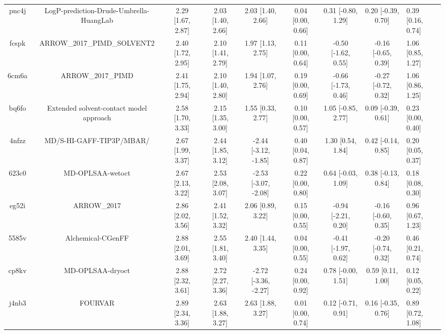 \documentclass{article}
\begin{document}
\begin{center}
\begin{longtable}{|cccccccc|}
 pnc4j &            LogP-prediction-Drude-Umbrella-HuangLab &  2.29 [1.67, 2.87] &  2.03 [1.40, 2.66] &     2.03 [1.40, 2.66] &  0.04 [0.00, 0.66] &   0.31 [-0.80, 1.29] &   0.20 [-0.39, 0.70] &     0.39 [0.16, 0.74] \\
 fcspk &                        ARROW\_2017\_PIMD\_SOLVENT2 &  2.40 [1.72, 2.95] &  2.10 [1.41, 2.79] &     1.97 [1.13, 2.75] &  0.11 [0.00, 0.64] &  -0.50 [-1.62, 0.55] &  -0.16 [-0.65, 0.39] &     1.06 [0.85, 1.27] \\
 6cm6a &                                  ARROW\_2017\_PIMD &  2.41 [1.75, 2.94] &  2.10 [1.40, 2.80] &     1.94 [1.07, 2.76] &  0.19 [0.00, 0.69] &  -0.66 [-1.73, 0.46] &  -0.27 [-0.72, 0.32] &     1.06 [0.86, 1.25] \\
 bq6fo &            Extended solvent-contact model approach &  2.58 [1.70, 3.33] &  2.15 [1.35, 3.00] &     1.55 [0.33, 2.77] &  0.10 [0.00, 0.57] &   1.05 [-0.85, 2.77] &   0.09 [-0.39, 0.61] &     0.23 [0.00, 0.40] \\
 4nfzz &                           MD/S-HI-GAFF-TIP3P/MBAR/ &  2.67 [1.99, 3.37] &  2.44 [1.85, 3.12] &  -2.44 [-3.12, -1.85] &  0.40 [0.04, 0.87] &    1.30 [0.54, 1.84] &   0.42 [-0.14, 0.85] &     0.20 [0.05, 0.37] \\
 623c0 &                                   MD-OPLSAA-wetoct &  2.67 [2.13, 3.22] &  2.53 [2.08, 3.07] &  -2.53 [-3.07, -2.08] &  0.22 [0.00, 0.80] &   0.64 [-0.03, 1.09] &   0.38 [-0.13, 0.84] &     0.18 [0.08, 0.30] \\
 eg52i &                                        ARROW\_2017 &  2.86 [2.02, 3.56] &  2.41 [1.52, 3.32] &     2.06 [0.89, 3.22] &  0.15 [0.00, 0.55] &  -0.94 [-2.21, 0.20] &  -0.16 [-0.60, 0.35] &     0.96 [0.67, 1.23] \\
 5585v &                                  Alchemical-CGenFF &  2.88 [2.01, 3.69] &  2.55 [1.81, 3.40] &     2.40 [1.44, 3.35] &  0.04 [0.00, 0.55] &  -0.41 [-1.97, 0.62] &  -0.20 [-0.74, 0.32] &     0.46 [0.21, 0.74] \\
 cp8kv &                                   MD-OPLSAA-dryoct &  2.88 [2.32, 3.61] &  2.72 [2.27, 3.36] &  -2.72 [-3.36, -2.27] &  0.24 [0.00, 0.92] &   0.78 [-0.00, 1.51] &    0.59 [0.11, 1.00] &     0.12 [0.05, 0.22] \\
 j4nb3 &                                            FOURVAR &  2.89 [2.34, 3.36] &  2.63 [1.88, 3.27] &     2.63 [1.88, 3.27] &  0.01 [0.00, 0.74] &   0.12 [-0.71, 0.91] &   0.16 [-0.35, 0.76] &     0.89 [0.72, 1.08] \\

\end{longtable}
\end{center}
\end{document}
